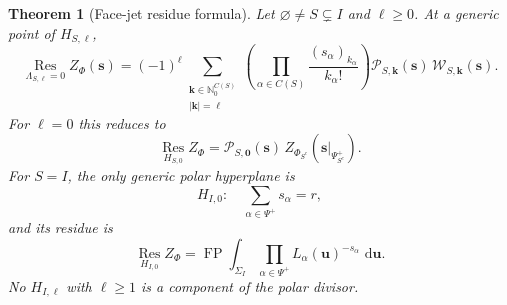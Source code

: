 \documentclass[11pt]{article}
\newtheorem{theorem}{Theorem}[section]
\renewcommand{\boxed}[1]{#1}
\newcommand{\Nzero}{\mathbb N_0}
\newcommand{\Res}{\operatorname*{Res}}
\newcommand{\FP}{\operatorname*{FP}}
\newcommand{\dd}{\,\mathrm d}
\newcommand{\RF}[2]{(#1)_{#2}}
\newcommand{\cP}{\mathcal P}
\newcommand{\cW}{\mathcal W}
\begin{document}
\begin{theorem}[Face-jet residue formula]\label{thm:residue}
Let $\varnothing\ne S\subsetneq I$ and $\ell\geq0$.  At a generic point
of $H_{S,\ell}$,
\begin{equation}\label{eq:residue-general}
 \boxed{
 \Res_{\Lambda_{S,\ell}=0} Z_\Phi(\mathbf s)
 =(-1)^\ell
 \sum_{\substack{\mathbf k\in\Nzero^{C(S)}\\|\mathbf k|=\ell}}
 \left(\prod_{\alpha\in C(S)}
       \frac{\RF{s_\alpha}{k_\alpha}}{k_\alpha!}\right)
 \cP_{S,\mathbf k}(\mathbf s)\,
 \cW_{S,\mathbf k}(\mathbf s).}
\end{equation}
For $\ell=0$ this reduces to
\begin{equation}\label{eq:unshifted}
 \Res_{H_{S,0}}Z_\Phi
 =\cP_{S,\mathbf0}(\mathbf s)\,
   Z_{\Phi_{S^c}}(\mathbf s|_{\Psi^+_{S^c}}).
\end{equation}
For $S=I$, the only generic polar hyperplane is
\begin{equation}\label{eq:full}
 H_{I,0}:\quad \sum_{\alpha\in\Psi^+}s_\alpha=r,
\end{equation}
and its residue is
\begin{equation}\label{eq:fullres}
 \Res_{H_{I,0}}Z_\Phi
 =\FP\int_{\Sigma_I}
   \prod_{\alpha\in\Psi^+}
   L_\alpha(\mathbf u)^{-s_\alpha}\,\dd\mathbf u.
\end{equation}
No $H_{I,\ell}$ with $\ell\geq1$ is a component of the polar divisor.
\end{theorem}
\end{document}
